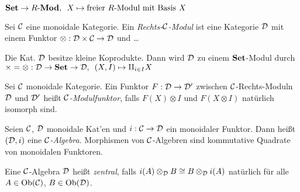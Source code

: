\documentclass{cheat-sheet}
\newcommand{\UnitOb}{\mathbbm{1}} %
\newenvironment{centertikzcd}
  {\begin{center}\begin{tikzcd}}
  {\end{tikzcd}\end{center}}
\begin{document}
\begin{bsp}
  $\mathbf{Set} \to {R}\text{-}\mathbf{Mod}, \enspace X \mapsto \text{freier $R$-Modul mit Basis $X$}$
\end{bsp}


\begin{defn}
  Sei $\mathcal{C}$ eine monoidale Kategorie. Ein \emph{Rechts-$\mathcal{C}$-Modul} ist eine Kategorie $\mathcal{D}$ mit einem Funktor $\otimes : \mathcal{D} \times \mathcal{C} \to \mathcal{D}$ und \ldots
\end{defn}

\begin{bsp}
  Die Kat. $\mathcal{D}$ besitze kleine Koprodukte.
  Dann wird $\mathcal{D}$ zu einem $\mathbf{Set}$-Modul durch $\times = \otimes : \mathcal{D} \to \mathbf{Set} \to \mathcal{D}, \enspace (X, I) \mapsto \amalg_{i \in I} X$
\end{bsp}

\begin{defn}
  Sei $\mathcal{C}$ monoidale Kategorie. Ein Funktor $F : \mathcal{D} \to \mathcal{D}'$ zwischen $\mathcal{C}$-Rechts-Moduln $\mathcal{D}$ und $\mathcal{D}'$ heißt \emph{$\mathcal{C}$-Modulfunktor}, falls $F(X) \otimes I$ und $F(X \otimes I)$ natürlich isomorph sind.
\end{defn}

\begin{defn}
  Seien $\mathcal{C}$, $\mathcal{D}$ monoidale Kat'en und $i : \mathcal{C} \to \mathcal{D}$ ein monoidaler Funktor.
  Dann heißt $(\mathcal{D}, i)$ eine \emph{$\mathcal{C}$-Algebra}.
  Morphismen von $\mathcal{C}$-Algebren sind kommutative Quadrate von monoidalen Funktoren.
\end{defn}


\begin{defn}
  Eine $\mathcal{C}$-Algebra $\mathcal{D}$ heißt \emph{zentral}, falls $i(A) \otimes_{\mathcal{D}} B \cong B \otimes_{\mathcal{D}} i(A)$ natürlich für alle $A \in \operatorname{Ob}(\mathcal{C})$, $B \in \operatorname{Ob}(\mathcal{D})$.
\end{defn}
\end{document}
